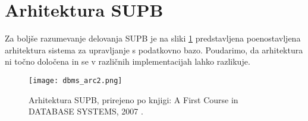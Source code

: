 \documentclass[a4paper,12pt,openright]{book}
\begin{document}
    \newpage
    \section{Arhitektura SUPB}

    Za boljše razumevanje delovanja SUPB je na sliki \ref{sl:dbms_architecture} predstavljena poenostavljena arhitektura sistema za upravljanje s podatkovno bazo. Poudarimo, da arhitektura ni točno določena in se v različnih implementacijah lahko razlikuje.

    \begin{figure}[h]
        \centerline{\texttt{[image: dbms\_arc2.png]}}
        \caption{Arhitektura SUPB, prirejeno po knjigi: A First Course in DATABASE SYSTEMS, 2007 \cite{ullman2007first}.}
        \label{sl:dbms_architecture}
    \end{figure}
\end{document}
